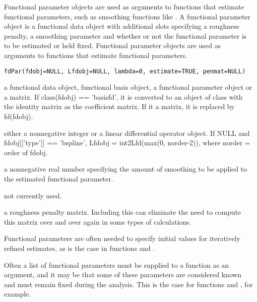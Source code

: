 \begin{Description}\relax
Functional parameter objects are used as arguments to functions that
estimate functional parameters, such as smoothing functions like
.  A functional parameter object is a functional
data object with additional slots specifying a roughness penalty, a
smoothing parameter and whether or not the functional parameter is to
be estimated or held fixed.  Functional parameter objects are used as
arguments to functions that estimate functional parameters.
\end{Description}
\begin{Usage}
\begin{verbatim}
fdPar(fdobj=NULL, Lfdobj=NULL, lambda=0, estimate=TRUE, penmat=NULL)
\end{verbatim}
\end{Usage}
\begin{Arguments}
\begin{ldescription}
\item[\code{fdobj}] a functional data object, functional basis object, a functional
parameter object or a matrix.  If class(fdobj) == 'basisfd', it is
converted to an object of class  with the identity matrix
as the coefficient matrix.  If it a matrix, it is replaced by
fd(fdobj).

\item[\code{Lfdobj}] either a nonnegative integer or a linear differential operator
object.  If NULL and fdobj[['type']] == 'bspline', Lfdobj =
int2Lfd(max(0, norder-2)), where norder = order of fdobj.

\item[\code{lambda}] a nonnegative real number specifying the amount of smoothing
to be applied to the estimated functional parameter.

\item[\code{estimate}] not currently used.
\item[\code{penmat}] a roughness penalty matrix.  Including this can eliminate the need
to compute this matrix over and over again in some types of
calculations.

\end{ldescription}
\end{Arguments}
\begin{Details}\relax
Functional parameters are often needed to specify initial
values for iteratively refined estimates, as is the case in
functions  and .

Often a list of functional parameters must be supplied to a function
as an argument, and it may be that some of these parameters are
considered known and must remain fixed during the analysis.  This is
the case for functions  and  , for
example.
\end{Details}
